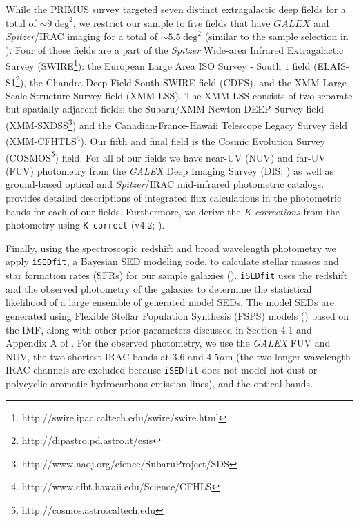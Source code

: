 \documentclass{aastex}
\begin{document}
While the PRIMUS survey targeted seven distinct extragalactic deep fields for a total of $\sim 9 \; \mathrm{deg}^2$, we restrict our sample to five fields that have $GALEX$ and {\em Spitzer}/IRAC imaging for a total of $\sim 5.5 \; \mathrm{deg}^2$ (similar to the sample selection in \citealt{Moustakas:2013aa}). Four of these fields are a part of the {\em Spitzer} Wide-area Infrared Extragalactic Survey (SWIRE\footnote{http://swire.ipac.caltech.edu/swire/swire.html}): the European Large Area ISO Survey - South $1$ field (ELAIS-S1\footnote{http://dipastro.pd.astro.it/esis}), the Chandra Deep Field South SWIRE field (CDFS), and the XMM Large Scale Structure Survey field (XMM-LSS). The XMM-LSS consists of two separate but spatially adjacent fields: the Subaru/XMM-Newton DEEP Survey field (XMM-SXDSS\footnote{http://www.naoj.org/cience/SubaruProject/SDS}) and the Canadian-France-Hawaii Telescope Legacy Survey field (XMM-CFHTLS\footnote{http://www.cfht.hawaii.edu/Science/CFHLS}). Our fifth and final field is the Cosmic Evolution Survey (COSMOS\footnote{http://cosmos.astro.caltech.edu}) field. For all of our fields we have near-UV (NUV) and far-UV (FUV) photometry from the {\em GALEX} Deep Imaging Survey (DIS; \citealt{Martin:2005aa, Morrissey:2005aa}) as well as ground-based optical and {\em Spitzer}/IRAC mid-infrared photometric catalogs. \cite{Moustakas:2013aa} provides detailed descriptions of integrated flux calculations in the photometric bands for each of our fields. Furthermore, we derive the {\em K-corrections} from the photometry using \texttt{K-correct} (v4.2; \citealt{Blanton:2007aa}). 

Finally, using the spectroscopic redshift and broad wavelength photometry we apply \texttt{iSEDfit}, a Bayesian SED modeling code, to calculate stellar masses and star formation rates (SFRs) for our sample galaxies (\citealt{Moustakas:2013aa}). \texttt{iSEDfit} uses the redshift and the observed photometry of the galaxies to determine the statistical likelihood of a large ensemble of generated model SEDs. The model SEDs are generated using Flexible Stellar Population Synthesis (FSPS) models (\citealt{Conroy:2010aa}) based on the \cite{Chabrier:2003aa} IMF, along with other prior parameters discussed in Section 4.1 and Appendix A of \cite{Moustakas:2013aa}. For the observed photometry, we use the {\em GALEX} FUV and NUV, the two shortest IRAC bands at $3.6$ and $4.5 \mu \mathrm{m}$ (the two longer-wavelength IRAC channels are excluded because \texttt{iSEDfit} does not model hot dust or polycyclic aromatic hydrocarbons emission lines), and the optical bands. 
\end{document}
